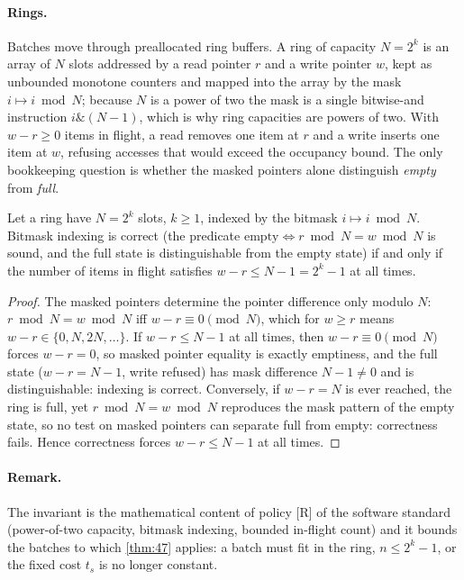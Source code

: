 \paragraph{Rings.}
Batches move through preallocated ring buffers. A ring of capacity $N = 2^k$ is an array of $N$ slots addressed by a read pointer $r$ and a write pointer $w$, kept as unbounded monotone counters and mapped into the array by the mask $i \mapsto i \bmod N$; because $N$ is a power of two the mask is a single bitwise-and instruction $i \mathbin{\&} (N-1)$, which is why ring capacities are powers of two. With $w - r \geq 0$ items in flight, a read removes one item at $r$ and a write inserts one item at $w$, refusing accesses that would exceed the occupancy bound. The only bookkeeping question is whether the masked pointers alone distinguish \emph{empty} from \emph{full}.

\begin{theorem}\label{thm:48}
Let a ring have $N = 2^k$ slots, $k \geq 1$, indexed by the bitmask $i \mapsto i \bmod N$. Bitmask indexing is correct (the predicate $\mathrm{empty} \iff r \bmod N = w \bmod N$ is sound, and the full state is distinguishable from the empty state) if and only if the number of items in flight satisfies $w - r \leq N - 1 = 2^k - 1$ at all times.
\end{theorem}

\begin{proof}
The masked pointers determine the pointer difference only modulo $N$: $r \bmod N = w \bmod N$ iff $w - r \equiv 0 \pmod N$, which for $w \geq r$ means $w - r \in \{0, N, 2N, \ldots\}$. If $w - r \leq N - 1$ at all times, then $w - r \equiv 0 \pmod N$ forces $w - r = 0$, so masked pointer equality is exactly emptiness, and the full state ($w - r = N - 1$, write refused) has mask difference $N - 1 \neq 0$ and is distinguishable: indexing is correct.
Conversely, if $w - r = N$ is ever reached, the ring is full, yet $r \bmod N = w \bmod N$ reproduces the mask pattern of the empty state, so no test on masked pointers can separate full from empty: correctness fails. Hence correctness forces $w - r \leq N - 1$ at all times.
\end{proof}

\paragraph{Remark.}
The invariant is the mathematical content of policy [R] of the software standard (power-of-two capacity, bitmask indexing, bounded in-flight count) and it bounds the batches to which \autoref{thm:47} applies: a batch must fit in the ring, $n \leq 2^k - 1$, or the fixed cost $t_s$ is no longer constant.
